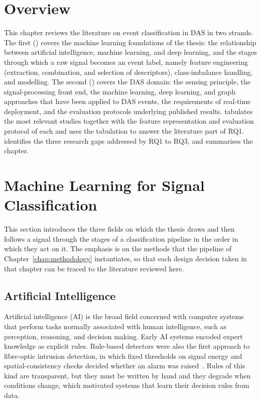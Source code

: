 \section{Overview}%
\label{sec:chap2Overview}%
%
This chapter reviews the literature on event classification in DAS in two strands. The first () covers the machine learning foundations of the thesis: the relationship between artificial intelligence, machine learning, and deep learning, and the stages through which a raw signal becomes an event label, namely feature engineering (extraction, combination, and selection of descriptors), class-imbalance handling, and modelling. The second () covers the DAS domain: the sensing principle, the signal-processing front end, the machine learning, deep learning, and graph approaches that have been applied to DAS events, the requirements of real-time deployment, and the evaluation protocols underlying published results.  tabulates the most relevant studies together with the feature representation and evaluation protocol of each and uses the tabulation to answer the literature part of RQ1.  identifies the three research gaps addressed by RQ1 to RQ3, and  summarises the chapter.

\section{Machine Learning for Signal Classification}
\label{sec:chap2ML}
This section introduces the three fields on which the thesis draws and then follows a signal through the stages of a classification pipeline in the order in which they act on it. The emphasis is on the methods that the pipeline of Chapter~\ref{chap:methodology} instantiates, so that each design decision taken in that chapter can be traced to the literature reviewed here.

\subsection{Artificial Intelligence}
\label{sec:chap2AI}
Artificial intelligence (AI) is the broad field concerned with computer systems that perform tasks normally associated with human intelligence, such as perception, reasoning, and decision making. Early AI systems encoded expert knowledge as explicit rules. Rule-based detectors were also the first approach to fibre-optic intrusion detection, in which fixed thresholds on signal energy and spatial-consistency checks decided whether an alarm was raised~\cite{juarez2005intrusion}. Rules of this kind are transparent, but they must be written by hand and they degrade when conditions change, which motivated systems that learn their decision rules from data.

